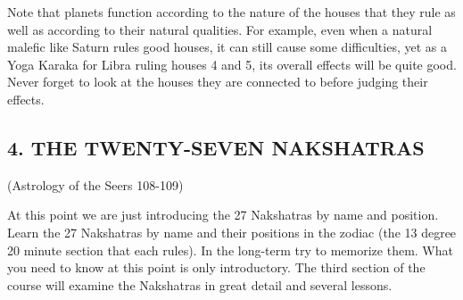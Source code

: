 Note that planets function according to the nature of the houses that they rule as well as according to their natural qualities. For example, even when a natural malefic like Saturn rules good houses, it can still cause some difficulties, yet as a Yoga Karaka for Libra ruling houses 4 and 5, its overall effects will be quite good. Never forget to look at the houses they are connected to before judging their effects.

\subsection{4. THE TWENTY-SEVEN NAKSHATRAS} (Astrology of the Seers 108-109)
 

At this point we are just introducing the 27 Nakshatras by name and position.  Learn the 27 Nakshatras by name and their positions in the zodiac (the 13 degree 20 minute section that each rules). In the long-term try to memorize them. What you need to know at this point is only introductory. The third section of the course will examine the Nakshatras in great detail and several lessons.


